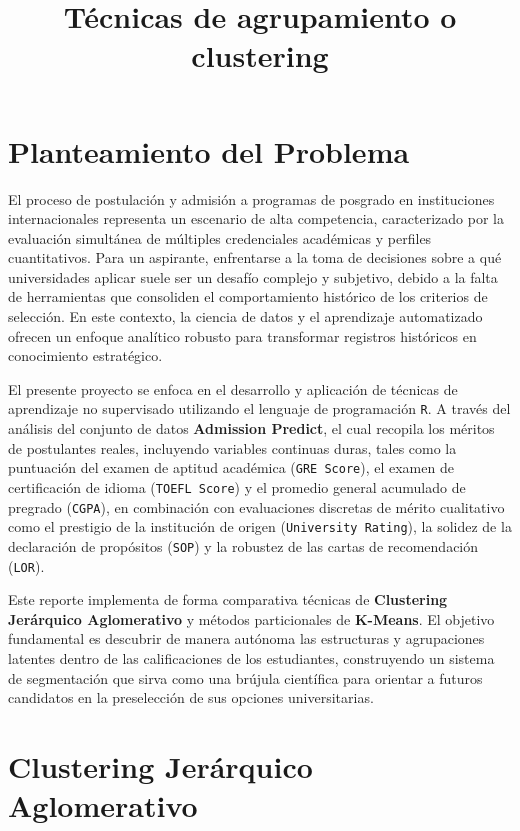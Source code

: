 \documentclass[
  10pt,
  a4paper]{article}
\begin{document}
\thispagestyle{empty}

\clearpage

\tableofcontents

\clearpage

\title{Técnicas de agrupamiento o clustering}

\section{Planteamiento del Problema}\label{planteamiento-del-problema}

El proceso de postulación y admisión a programas de posgrado en instituciones internacionales representa un escenario de alta competencia, caracterizado por la evaluación simultánea de múltiples credenciales académicas y perfiles cuantitativos. Para un aspirante, enfrentarse a la toma de decisiones sobre a qué universidades aplicar suele ser un desafío complejo y subjetivo, debido a la falta de herramientas que consoliden el comportamiento histórico de los criterios de selección. En este contexto, la ciencia de datos y el aprendizaje automatizado ofrecen un enfoque analítico robusto para transformar registros históricos en conocimiento estratégico.

El presente proyecto se enfoca en el desarrollo y aplicación de técnicas de aprendizaje no supervisado utilizando el lenguaje de programación \texttt{R}. A través del análisis del conjunto de datos \textbf{Admission Predict}, el cual recopila los méritos de postulantes reales, incluyendo variables continuas duras, tales como la puntuación del examen de aptitud académica (\texttt{GRE\ Score}), el examen de certificación de idioma (\texttt{TOEFL\ Score}) y el promedio general acumulado de pregrado (\texttt{CGPA}), en combinación con evaluaciones discretas de mérito cualitativo como el prestigio de la institución de origen (\texttt{University\ Rating}), la solidez de la declaración de propósitos (\texttt{SOP}) y la robustez de las cartas de recomendación (\texttt{LOR}).

Este reporte implementa de forma comparativa técnicas de \textbf{Clustering Jerárquico Aglomerativo} y métodos particionales de \textbf{K-Means}. El objetivo fundamental es descubrir de manera autónoma las estructuras y agrupaciones latentes dentro de las calificaciones de los estudiantes, construyendo un sistema de segmentación que sirva como una brújula científica para orientar a futuros candidatos en la preselección de sus opciones universitarias.

\section{Clustering Jerárquico Aglomerativo}\label{clustering-jeruxe1rquico-aglomerativo}
\end{document}
